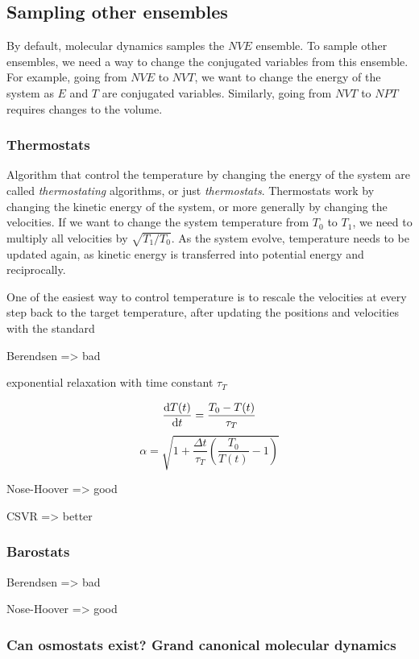 \documentclass[thesis]{subfiles}
\begin{document}
\subsection{Sampling other ensembles}

By default, molecular dynamics samples the $NVE$ ensemble. To sample other
ensembles, we need a way to change the conjugated variables from this ensemble.
For example, going from $NVE$ to $NVT$, we want to change the energy of the
system as $E$ and $T$ are conjugated variables. Similarly, going from $NVT$ to
$NPT$ requires changes to the volume.

\subsubsection{Thermostats}

Algorithm that control the temperature by changing the energy of the system are
called \emph{thermostating} algorithms, or just \emph{thermostats}. Thermostats
work by changing the kinetic energy of the system, or more generally by changing
the velocities. If we want to change the system temperature from $T_0$ to $T_1$,
we need to multiply all velocities by $\sqrt{T_1 / T_0}$. As the system evolve,
temperature needs to be updated again, as kinetic energy is transferred into
potential energy and reciprocally.

One of the easiest way to control temperature is to rescale the velocities at
every step back to the target temperature, after updating the positions and
velocities with the standard


Berendsen => bad

exponential relaxation with time constant $\tau_T$

\[\frac{\text{d} T(t)}{\text{d} t} = \frac{T_0 - T(t)}{\tau_T}\]
\[\alpha = \sqrt{1 + \frac{\Delta t}{\tau_T} \left(\frac{T_0}{T(t)} - 1\right) }\]

Nose-Hoover => good

CSVR => better

\subsubsection{Barostats}

Berendsen => bad

Nose-Hoover => good

\subsubsection{Can osmostats exist? Grand canonical molecular dynamics}
\end{document}
